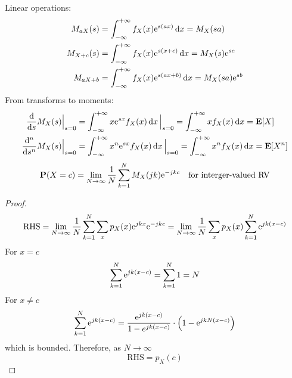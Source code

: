 \documentclass[device=normal, lang=en]{elegantbook}
\numberwithin{equation}{section}
\begin{document}
Linear operations:
\begin{equation}
\begin{aligned}
    M_{aX}(s) &= \int_{-\infty}^{+\infty} f_{X}(x) \mathrm{e}^{s(ax)} \dd{x} = M_{X}(sa) \\
    M_{X + c}(s) &= \int_{-\infty}^{+\infty} f_{X}(x) \mathrm{e}^{s(x + c)} \dd{x} = M_{X}(s) \mathrm{e}^{sc} \\ 
    M_{aX + b} &= \int_{-\infty}^{+\infty} f_{X}(x) \mathrm{e}^{s(ax + b)} \dd{x} = M_{X}(sa) \mathrm{e}^{sb}
\end{aligned}
\end{equation}
From transforms to moments:
\begin{equation}
\begin{aligned}
    \dv{s} M_{X}(s) \Big|_{s=0} &= \int_{-\infty}^{+\infty} x \mathrm{e}^{sx} f_{X}(x) \dd{x} \Big|_{s=0} = \int_{-\infty}^{+\infty} x f_{X}(x) \dd{x} = \mathbf{E}[X] \\
    \dv[n]{s} M_{X}(s) \Big|_{s=0} &= \int_{-\infty}^{+\infty} x^n \mathrm{e}^{sx} f_{X}(x) \dd{x} \Big|_{s=0} = \int_{-\infty}^{+\infty} x^n f_{X}(x) \dd{x} = \mathbf{E}[X^n]
\end{aligned}
\end{equation}
\begin{equation}
    \mathbf{P}(X = c) = \lim_{N \to \infty} \frac{1}{N} \sum_{k=1}^{N} M_{X}(jk) \mathrm{e}^{-jk c} \quad \text{for interger-valued RV}
\end{equation}
\begin{proof}
    \begin{equation}
        \text{RHS} = \lim_{N \to \infty} \frac{1}{N} \sum_{k=1}^{N} \sum_{x} p_{X}(x) \mathrm{e}^{jkx} \mathrm{e}^{-jk c} = \lim_{N \to \infty} \frac{1}{N} \sum_{x} p_{X}(x) \sum_{k=1}^{N} \mathrm{e}^{jk(x - c)} 
    \end{equation}
    For $x = c$
    \begin{equation}
        \sum_{k=1}^{N} \mathrm{e}^{jk(x - c)} = \sum_{k=1}^{N} 1 = N
    \end{equation}
    For $x \neq c$
    \begin{equation}
        \sum_{k=1}^{N} \mathrm{e}^{jk(x - c)} = \frac{\mathrm{e}^{jk(x - c)}}{1 - e^{jk(x - c)}} \cdot \qty(1 - \mathrm{e}^{jkN(x - c)})
    \end{equation}
    which is bounded. Therefore, as $N \to \infty$
    \begin{equation}
        \text{RHS} = p_{X}(c)
    \end{equation}
\end{proof}
\end{document}
